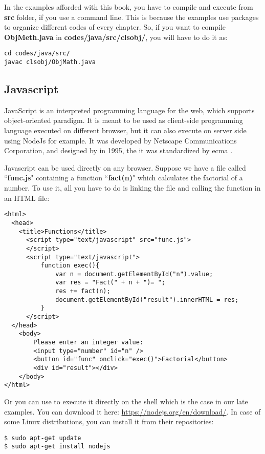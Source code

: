 \documentclass{KodeBookAr}
\begin{document}
In the examples afforded with this book, you have to compile and execute from \textbf{src} folder, if you use a command line. 
This is because the examples use packages to organize different codes of every chapter. 
So, if you want to compile \textbf{ObjMeth.java} in \textbf{codes/java/src/clsobj/}, you will have  to do it as:
\begin{lstlisting}[style=shellStyle]
cd codes/java/src/
javac clsobj/ObjMath.java 
\end{lstlisting}

\subsection{Javascript}


JavaScript is an interpreted programming language for the web, which supports object-oriented paradigm. 
It is meant to be used as client-side programming language executed on different browser, but it can also execute on server side using NodeJs for example.
It was developed by Netscape Communications Corporation, and designed by  in 1995, the it was standardized by \ac{ecma} \citep{2018-rubens}. 


Javascript can be used directly on any browser. 
Suppose we have a file called ``\textbf{func.js}" containing a function ``\textbf{fact(n)}" which calculates the factorial of a number. 
To use it, all you have to do is linking the file and calling the function in an HTML file:
\begin{lstlisting}[language={[KB]Javascript}, style=codeStyle]
<html>
  <head>
    <title>Functions</title>
      <script type="text/javascript" src="func.js">
      </script>
      <script type="text/javascript">
          function exec(){
              var n = document.getElementById("n").value;
              var res = "Fact(" + n + ")= ";
              res += fact(n);
              document.getElementById("result").innerHTML = res;
          }
      </script>
  </head>
    <body>
        Please enter an integer value: 
        <input type="number" id="n" />
        <button id="func" onclick="exec()">Factorial</button>
        <div id="result"></div>
    </body>
</html>
\end{lstlisting}


Or you can use  to execute it directly on the shell which is the case in our late examples. 
You can download it here: \url{https://nodejs.org/en/download/}. 
In case of some Linux distributions, you can install it from their repositories:
\begin{lstlisting}[style=shellStyle]
$ sudo apt-get update
$ sudo apt-get install nodejs
\end{lstlisting}
\end{document}
